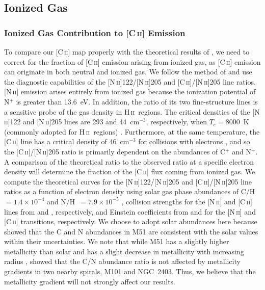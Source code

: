 \subsection{Ionized Gas}\label{ionized_gas}
\subsubsection{Ionized Gas Contribution to [C\,\textsc{ii}] Emission}\label{ionized_gas_contribution}
To compare our [C\,\textsc{ii}] map properly with the theoretical results of \citet{1999ApJ...527..795K, 2006ApJ...644..283K}, we need to correct for the fraction of [C\,\textsc{ii}] emission arising from ionized gas, as [C\,\textsc{ii}] emission can originate in both neutral and ionized gas.  We follow the method of \citet{2006ApJ...652L.125O} and use the diagnostic capabilities of the [N\,\textsc{ii}]122/[N\,\textsc{ii}]205 and [C\,\textsc{ii}]/[N\,\textsc{ii}]205 line ratios. [N\,\textsc{ii}] emission arises entirely from ionized gas because the ionization potential of N$^{+}$ is greater than 13.6~eV. In addition, the ratio of its two fine-structure lines is a sensitive probe of the gas density in H\,\textsc{ii}~regions. The critical densities of the [N\,\textsc{ii}]122 and [N\,\textsc{ii}]205 lines are 293 and 44~cm$^{-3}$, respectively, when $T_{e} = 8000$~K (commonly adopted for H\,\textsc{ii}~regions) \citep[][]{2006ApJ...652L.125O}.  Furthermore, at the same temperature, the [C\,\textsc{ii}] line has a critical density of 46~cm$^{-3}$ for collisions with electrons \citep[][]{2006ApJ...652L.125O}, and so the [C\,\textsc{ii}]/[N\,\textsc{ii}]205 ratio is primarily dependent on the abundances of C$^{+}$ and N$^{+}$. A comparison of the theoretical ratio to the observed ratio at a specific electron density will determine the fraction of the [C\,\textsc{ii}] flux coming from ionized gas.  We compute the theoretical curves for the [N\,\textsc{ii}]122/[N\,\textsc{ii}]205 and [C\,\textsc{ii}]/[N\,\textsc{ii}]205 line ratios as a function of electron density using solar gas phase abundances of C/H~$= 1.4 \times 10^{-4}$ and N/H~$= 7.9 \times 10^{-5}$ \citep{1996ARA&A..34..279S}, collision strengths for the [N\,\textsc{ii}] and [C\,\textsc{ii}] lines from \citet{2004MNRAS.348.1275H} and \citet{1992ApJS...80..425B}, respectively, and Einstein coefficients from \citet{1997A&AS..123..159G} and \citet{1998A&AS..131..499G} for the [N\,\textsc{ii}] and [C\,\textsc{ii}] transitions, respectively.  We choose to adopt solar abundances here because \citet{2004AJ....128.2772G} showed that the C and N abundances in M51 are consistent with the solar values within their uncertainties.  We note that while M51 has a slightly higher metallicity than solar \citep{2009ARA&A..47..481A} and has a slight decrease in metallicity with increasing radius \citep{2010ApJS..190..233M,2012ApJ...755..165M}, \citet{1999ApJ...513..168G} showed that the C/N abundance ratio is not affected by metallicity gradients in two nearby spirals, M101 and NGC~2403.  Thus, we believe that the metallicity gradient will not strongly affect our results.


